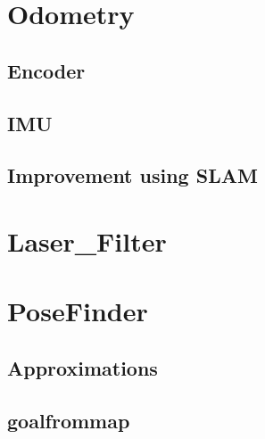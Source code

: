 \section{Odometry}
\subsection{Encoder}
\subsection{IMU}
\subsection{Improvement using SLAM}

\section{Laser\_Filter}

\section{PoseFinder}
\subsection{Approximations}
\subsection{goalfrommap}







